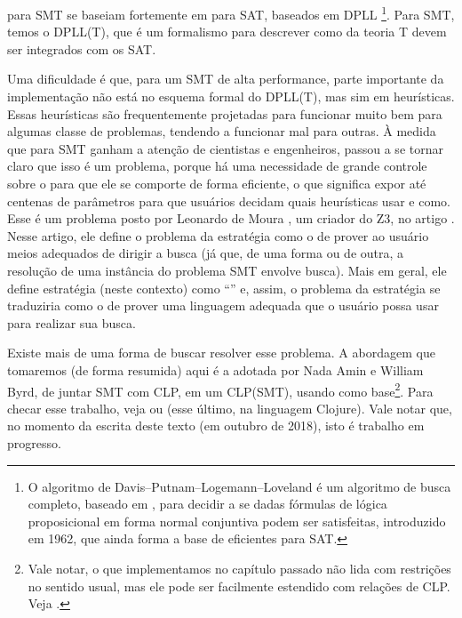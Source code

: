 \documentclass{article}
\begin{document}
 para SMT se baseiam fortemente em 
para SAT, baseados em DPLL \footnote{O algoritmo de
  Davis–Putnam–Logemann–Loveland é um algoritmo de busca completo,
  baseado em , para decidir a se dadas fórmulas
  de lógica proposicional em forma normal conjuntiva podem ser
  satisfeitas, introduzido em 1962, que ainda forma a base de
   eficientes para SAT.}. Para SMT, temos o DPLL(T),
que é um formalismo para descrever como  da teoria
T devem ser integrados com os  SAT.

Uma dificuldade é que, para um  SMT de alta
performance, parte importante da implementação não está no esquema
formal do DPLL(T), mas sim em heurísticas. Essas heurísticas
são frequentemente projetadas para funcionar muito bem para algumas
classe de problemas, tendendo a funcionar mal para outras. À
medida que  para SMT ganham a atenção de cientistas e
engenheiros, passou a se tornar claro que isso é um problema, porque há
uma necessidade de grande controle sobre o  para que
ele se comporte de forma eficiente, o que 
significa expor até centenas de parâmetros para que usuários
decidam quais heurísticas usar e como. Esse é um problema posto por
Leonardo de Moura , um criador do Z3, no artigo
\cite{moura}. Nesse artigo, ele define o problema da estratégia como o
de prover ao usuário meios adequados de dirigir a busca (já que, de
uma forma ou de outra, a resolução de uma instância do problema SMT
envolve busca). Mais em geral, ele define estratégia (neste contexto)
como ``''\cite{moura} e, assim, o problema da estratégia se
traduziria como o de prover uma linguagem adequada que o usuário possa
usar para realizar sua busca.

Existe mais de uma forma de buscar resolver esse problema. A abordagem
que tomaremos (de forma resumida) aqui é a adotada por Nada Amin e
William Byrd, de juntar SMT com CLP, em um CLP(SMT), usando 
como base\footnote{Vale notar, o que implementamos no capítulo passado
  não lida com restrições no sentido usual, mas ele pode ser
  facilmente estendido com relações de CLP. Veja \cite{alvis}.}. Para
checar esse trabalho, veja \cite{namin} ou
\cite{namim} (esse último, na linguagem Clojure). Vale notar que, no
momento da escrita deste texto (em outubro de 2018), isto é trabalho
em progresso.
\end{document}
